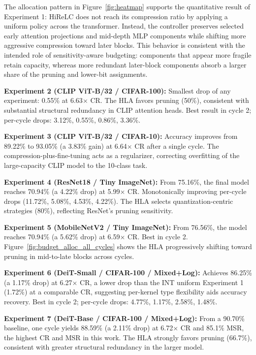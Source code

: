 \documentclass[preprint,12pt,authoryear]{elsarticle}
\begin{document}
\noindent The allocation pattern in Figure~\ref{fig:heatmap} supports the quantitative
result of Experiment 1: HiReLC does not reach its compression ratio by applying a
uniform policy across the transformer. Instead, the controller preserves selected early
attention projections and mid-depth MLP components while shifting more aggressive
compression toward later blocks. This behavior is consistent with the intended role of
sensitivity-aware budgeting: components that appear more fragile retain capacity,
whereas more redundant later-block components absorb a larger share of the pruning and
lower-bit assignments.

\textbf{Experiment 2 (CLIP ViT-B/32 / CIFAR-100):} Smallest drop of any experiment: 0.55\% at 6.63$\times$ CR. The HLA favors pruning (50\%), consistent with substantial structural redundancy in CLIP attention heads. Best result in cycle 2; per-cycle drops: 3.12\%, 0.55\%, 0.86\%, 3.36\%.

\textbf{Experiment 3 (CLIP ViT-B/32 / CIFAR-10):} Accuracy improves from 89.22\% to 93.05\% (a 3.83\% gain) at 6.64$\times$ CR after a single cycle. The compression-plus-fine-tuning acts as a regularizer, correcting overfitting of the large-capacity CLIP model to the 10-class task.

\textbf{Experiment 4 (ResNet18 / Tiny ImageNet):} From 75.16\%, the final model reaches 70.94\% (a 4.22\% drop) at 5.99$\times$ CR. Monotonically improving per-cycle drops (11.72\%, 5.08\%, 4.53\%, 4.22\%). The HLA selects quantization-centric strategies (80\%), reflecting ResNet's pruning sensitivity.

\textbf{Experiment 5 (MobileNetV2 / Tiny ImageNet):} From 76.56\%, the model reaches 70.94\% (a 5.62\% drop) at 6.59$\times$ CR. Best in cycle 2. Figure~\ref{fig:budget_alloc_all_cycles} shows the HLA progressively shifting toward pruning in mid-to-late blocks across cycles.

\textbf{Experiment 6 (DeiT-Small / CIFAR-100 / Mixed+Log):} Achieves 86.25\% (a 1.17\% drop) at 6.27$\times$ CR, a lower drop than the INT uniform Experiment 1 (1.72\%) at a comparable CR, suggesting per-kernel type flexibility aids accuracy recovery. Best in cycle 2; per-cycle drops: 4.77\%, 1.17\%, 2.58\%, 1.48\%.

\textbf{Experiment 7 (DeiT-Base / CIFAR-100 / Mixed+Log):} From a 90.70\% baseline, one cycle yields 88.59\% (a 2.11\% drop) at 6.72$\times$ CR and 85.1\% MSR, the highest CR and MSR in this work. The HLA strongly favors pruning (66.7\%), consistent with greater structural redundancy in the larger model.
\end{document}
